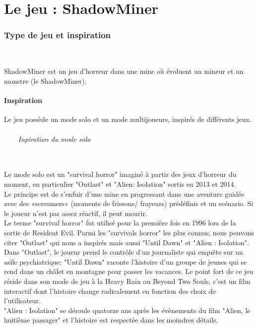 \documentclass[titlepage, 13px, a4paper]{report}
\begin{document}


\newpage


\part{Le jeu : ShadowMiner}
\section{Type de jeu et inspiration}
\paragraph*{} \hspace{0pt} \\
ShadowMiner est un jeu d’horreur dans une mine où évoluent un mineur et un monstre (le ShadowMiner). \\

\subsection{Inspiration}
Le jeu possède un mode solo et un mode multijoueurs, inspirés de différents jeux. \\
\paragraph[Inpiration du mode solo]{~~~~Inpiration du mode solo} \hspace{0pt} \\
Le mode solo est un "survival horror" imaginé à partir des jeux d'horreur du moment, 
en particulier "Outlast" et "Alien: Isolation" sortis en 2013 et 2014. 
\\
Le principe est de s'enfuir d'une mine en progressant dans une aventure guidée 
avec des «screamers» (moments de frissons/ frayeurs) prédéfinis et un scénario. 
Si le joueur n'est pas assez réactif, il peut mourir.
\\
Le terme "survival horror" fut utilisé pour la première fois en 1996 lors de la sortie 
de Resident Evil. Parmi les "survivals horror" les plus connus, nous pouvons citer "Outlast" qui 
nous a inspirés mais aussi "Until Dawn" et "Alien : Isolation". 
\\
Dans "Outlast", le joueur prend le contrôle d'un journaliste qui enquête sur un asile psychiatrique; 
"Until Dawn" raconte l'histoire d'un groupe de jeunes qui se rend dans un châlet 
en montagne pour passer les vacances. Le point fort de ce jeu réside dans son mode 
de jeu à la Heavy Rain ou Beyond Two Souls, c'est un film interactif dont l'histoire 
change radicalement en fonction des choix de l'utilisateur. 
\\
"Alien : Isolation" se déroule quatorze ans après les évènements du film "Alien, le huitième passager" 
et l'histoire est respectée dans les moindres détails. \\ \\
\end{document}
